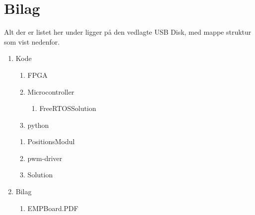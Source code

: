 \appendix
\section{Bilag} \hfill
Alt der er listet her under ligger på den vedlagte USB Disk, med mappe struktur som vist nedenfor.
\label{sec:bilag}
\begin{enumerate}[noitemsep]
	\item Kode
	\begin{enumerate}[noitemsep]
		\item FPGA
		\item Microcontroller
		\begin{enumerate}
			\item FreeRTOS\textunderscore Solution
		\end{enumerate}
		\item python
	\end{enumerate}
	\begin{enumerate}
		\item PositionsModul
		\item pwm-driver
		\item Solution
	\end{enumerate}
	\item Bilag
	\begin{enumerate}[noitemsep]
		\item EMPBoard.PDF \label{itm:empboard}
	\end{enumerate}
\end{enumerate}
